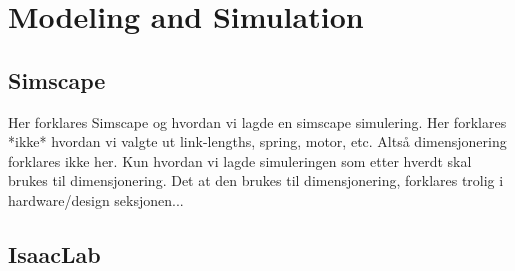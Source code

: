 \section{Modeling and Simulation}

\subsection{Simscape}

Her forklares Simscape og hvordan vi lagde en simscape simulering. Her forklares *ikke* hvordan vi valgte ut link-lengths, spring, motor, etc. Altså dimensjonering forklares ikke her. Kun hvordan vi lagde simuleringen som etter hverdt skal brukes til dimensjonering. Det at den brukes til dimensjonering, forklares trolig i hardware/design seksjonen...

\subsection{IsaacLab}

